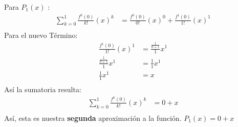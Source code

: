 Para $P_{1}(x)$ :
\begin{align*}
   \sum_{k=0}^{1} \frac{f^{k}(0)}{k!}(x)^{k} &= \frac{f^{0}(0)}{0!}(x)^{0} + \frac{f^{1}(0)}{1!}(x)^{1} \\
\end{align*}
Para el nuevo Término:
\begin{align*}
   \frac{f^{1}(0)}{1!}(x)^{1}                    &= \frac{\frac{1}{0+1}}{1}x^{1} \\
   \frac{\frac{1}{0+1}}{1}x^{1}                  &= \frac{1}{1}x^{1} \\
   \frac{1}{1}x^{1}                              &= x \\
\end{align*}
Así la sumatoria resulta:
\begin{align*}
   \sum_{k=0}^{1} \frac{f^{k}(0)}{k!}(x)^{k} &= 0 + x\\
\end{align*}
Así, esta es nuestra \textbf{segunda} aproximación a la función. $P_{1}(x) = 0 + x$ \\


